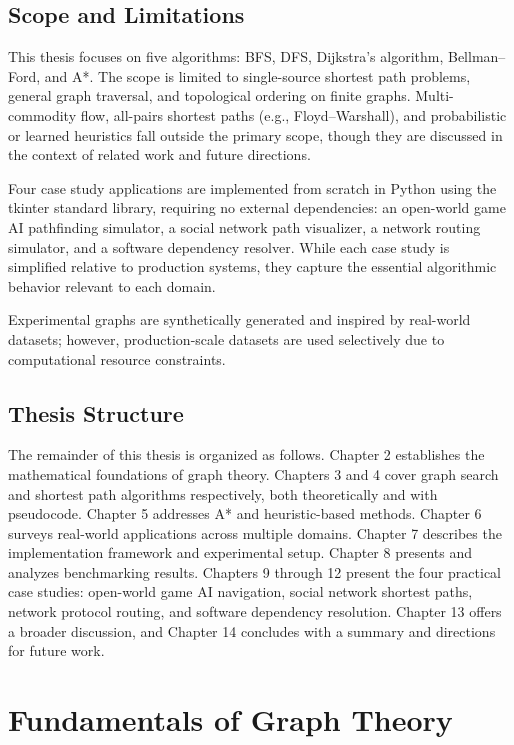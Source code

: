 \documentclass[12pt, a4paper, oneside]{report}
\theoremstyle{definition}
\begin{document}
\section{Scope and Limitations}

This thesis focuses on five algorithms: BFS, DFS, Dijkstra's algorithm, Bellman–Ford, and A*. The scope is limited to single-source shortest path problems, general graph traversal, and topological ordering on finite graphs. Multi-commodity flow, all-pairs shortest paths (e.g., Floyd–Warshall), and probabilistic or learned heuristics fall outside the primary scope, though they are discussed in the context of related work and future directions.

Four case study applications are implemented from scratch in Python using the tkinter standard library, requiring no external dependencies: an open-world game AI pathfinding simulator, a social network path visualizer, a network routing simulator, and a software dependency resolver. While each case study is simplified relative to production systems, they capture the essential algorithmic behavior relevant to each domain.

Experimental graphs are synthetically generated and inspired by real-world datasets; however, production-scale datasets are used selectively due to computational resource constraints.

\section{Thesis Structure}

The remainder of this thesis is organized as follows. Chapter 2 establishes the mathematical foundations of graph theory. Chapters 3 and 4 cover graph search and shortest path algorithms respectively, both theoretically and with pseudocode. Chapter 5 addresses A* and heuristic-based methods. Chapter 6 surveys real-world applications across multiple domains. Chapter 7 describes the implementation framework and experimental setup. Chapter 8 presents and analyzes benchmarking results. Chapters 9 through 12 present the four practical case studies: open-world game AI navigation, social network shortest paths, network protocol routing, and software dependency resolution. Chapter 13 offers a broader discussion, and Chapter 14 concludes with a summary and directions for future work.

\chapter{Fundamentals of Graph Theory}
\end{document}
